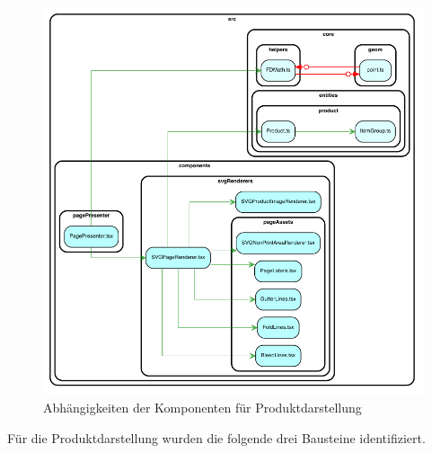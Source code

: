 
\begin{figure}[H]
    \centering
    \includegraphics{diagrams/Ist-Architektur/page-presenter-analysis.pdf}
    \caption{Abhängigkeiten der Komponenten für Produktdarstellung}
    \label{fig:Produktdarstellung}
\end{figure}

Für die Produktdarstellung wurden die folgende drei Bausteine identifiziert.
\begin{multicols}{3}
    
\end{multicols}